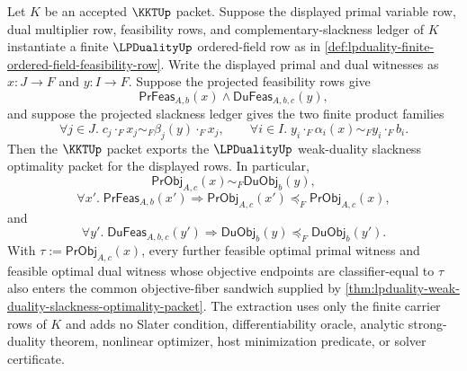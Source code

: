 \begin{theorem}
\label{thm:kkt-finite-slackness-optimality-extraction}
Let $K$ be an accepted $\KKTUp$ packet. Suppose the displayed primal variable row, dual multiplier row, feasibility rows, and complementary-slackness ledger of $K$ instantiate a finite $\LPDualityUp$ ordered-field row as in \autoref{def:lpduality-finite-ordered-field-feasibility-row}. Write the displayed primal and dual witnesses as $x:J\to F$ and $y:I\to F$. Suppose the projected feasibility rows give
$$
\mathsf{PrFeas}_{A,b}(x)\land\mathsf{DuFeas}_{A,b,c}(y),
$$
and suppose the projected slackness ledger gives the two finite product families
$$
\forall j\in J.\; c_j\cdot_Fx_j\sim_F\beta_j(y)\cdot_Fx_j,
\qquad
\forall i\in I.\; y_i\cdot_F\alpha_i(x)\sim_Fy_i\cdot_Fb_i.
$$
Then the $\KKTUp$ packet exports the $\LPDualityUp$ weak-duality slackness optimality packet for the displayed rows. In particular,
$$
\mathsf{PrObj}_{A,c}(x)\sim_F\mathsf{DuObj}_{b}(y),
$$
$$
\forall x'.\;\mathsf{PrFeas}_{A,b}(x')
\Longrightarrow
\mathsf{PrObj}_{A,c}(x')\preceq_F\mathsf{PrObj}_{A,c}(x),
$$
and
$$
\forall y'.\;\mathsf{DuFeas}_{A,b,c}(y')
\Longrightarrow
\mathsf{DuObj}_{b}(y)\preceq_F\mathsf{DuObj}_{b}(y').
$$
With $\tau:=\mathsf{PrObj}_{A,c}(x)$, every further feasible optimal primal witness and feasible optimal dual witness whose objective endpoints are classifier-equal to $\tau$ also enters the common objective-fiber sandwich supplied by \autoref{thm:lpduality-weak-duality-slackness-optimality-packet}. The extraction uses only the finite carrier rows of $K$ and adds no Slater condition, differentiability oracle, analytic strong-duality theorem, nonlinear optimizer, host minimization predicate, or solver certificate.
\end{theorem}
